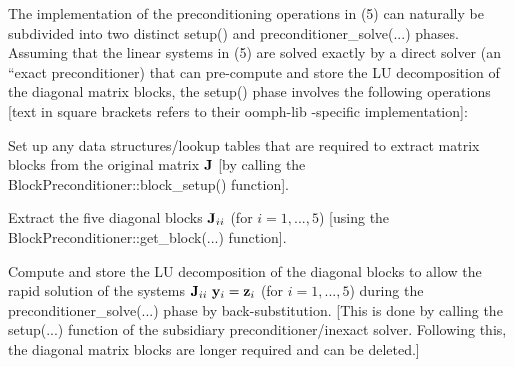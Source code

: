 The implementation of the preconditioning operations in (5) can naturally be subdivided into two distinct {\ttfamily setup()} and {\ttfamily preconditioner\+\_\+solve}(...) phases. Assuming that the linear systems in (5) are solved exactly by a direct solver (an ``exact preconditioner\textquotesingle{}\textquotesingle{}) that can pre-\/compute and store the LU decomposition of the diagonal matrix blocks, the {\ttfamily setup()} phase involves the following operations \mbox{[}text in square brackets refers to their {\ttfamily oomph-\/lib} -\/specific implementation\mbox{]}\+:
\begin{DoxyItemize}
\item Set up any data structures/lookup tables that are required to extract matrix blocks from the original matrix ${\bf J}$ \mbox{[}by calling the {\ttfamily Block\+Preconditioner\+::block\+\_\+setup()} function\mbox{]}.
\item Extract the five diagonal blocks ${\bf J}_{ii}$ (for $i=1,...,5$) \mbox{[}using the {\ttfamily Block\+Preconditioner\+::get\+\_\+block}(...) function\mbox{]}.
\item Compute and store the LU decomposition of the diagonal blocks to allow the rapid solution of the systems ${\bf J}_{ii} \ {\bf y}_i = {\bf z}_i$ (for $i=1,...,5$) during the {\ttfamily preconditioner\+\_\+solve}(...) phase by back-\/substitution. \mbox{[}This is done by calling the {\ttfamily setup}(...) function of the subsidiary preconditioner/inexact solver. Following this, the diagonal matrix blocks are longer required and can be deleted.\mbox{]}
\end{DoxyItemize}

